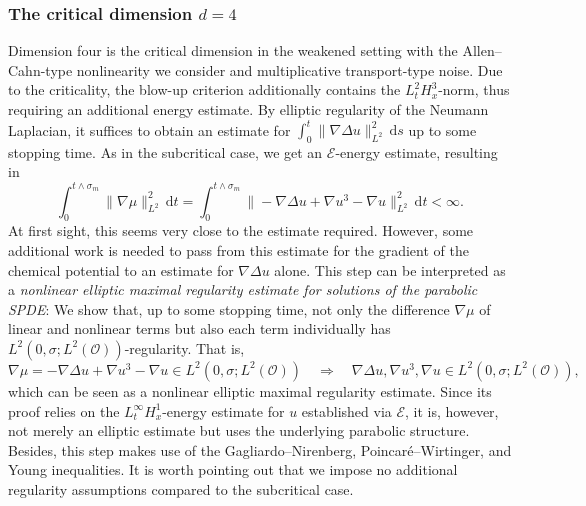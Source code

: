 \documentclass[reqno]{amsart}
\newcommand{\sO}{\mathscr{O}}
\newcommand{\1}{\mathbf{1}}
\newcommand{\grad}{\nabla}
\newcommand{\dt}{\,\mathrm{d}t}
\newcommand{\ds}{\,\mathrm{d}s}
\begin{document}
\subsubsection{The critical dimension \texorpdfstring{$d=4$}{d=4}}
\label{subsec:overviewglobalWPd4}

Dimension four is the critical dimension in the weakened setting with the Allen--Cahn-type nonlinearity we consider and multiplicative transport-type noise. Due to the criticality, the blow-up criterion additionally contains the $L_t^2H_x^3$-norm, thus requiring an additional energy estimate. By elliptic regularity of the Neumann Laplacian, it suffices to obtain an estimate for $\int_0^{t}\|\grad \Delta u\|_{L^2}^2\ds$ up to some stopping time. As in the subcritical case, we get an $\mathcal{E}$-energy estimate, resulting in
\begin{equation*}
    \int_0^{t\land\sigma_m}\|\grad \mu\|_{L^2}^2\dt = \int_0^{t\land\sigma_m}\|-\grad \Delta u+\grad u^3-\grad u\|_{L^2}^2\dt <\infty.
\end{equation*}
At first sight, this seems very close to the estimate required. However, some additional work is needed to pass from this estimate for the gradient of the chemical potential to an estimate for $\grad \Delta u$ alone. This step can be interpreted as a \textit{nonlinear elliptic maximal regularity estimate for solutions of the parabolic SPDE}: We show that, up to some stopping time, not only the difference $\grad \mu$ of linear and nonlinear terms but also each term individually has $L^2(0,\sigma;L^2(\sO))$-regularity. That is, \begin{equation*}
    \grad \mu = -\grad \Delta u + \grad u^3-\grad u \in L^2(0,\sigma;L^2(\sO)) \quad\Rightarrow \quad\grad \Delta u, \grad u^3,\grad u \in L^2(0,\sigma;L^2(\sO)),
\end{equation*}
which can be seen as a nonlinear elliptic maximal regularity estimate. Since its proof relies on the $L_t^\infty H_x^1$-energy estimate for $u$ established via $\mathcal{E}$, it is, however, not merely an elliptic estimate but uses the underlying parabolic structure. Besides, this step makes use of the Gagliardo--Nirenberg, Poincaré--Wirtinger, and Young inequalities. It is worth pointing out that we impose no additional regularity assumptions compared to the subcritical case.
\end{document}
